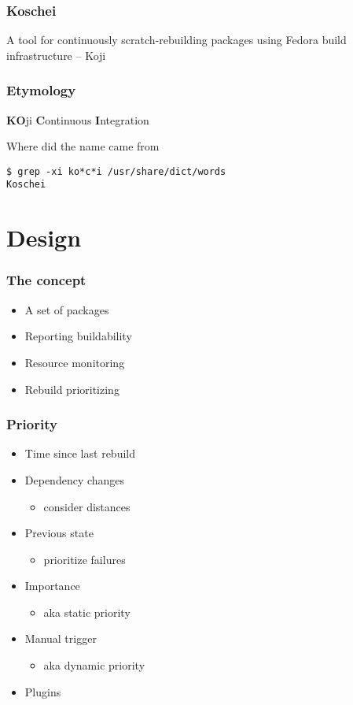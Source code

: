\documentclass[pdftex,unicode,xcolor=table]{beamer}
\begin{document}
\Large
\begin{frame}
  \frametitle{Koschei}
  A tool for continuously scratch-rebuilding
  packages using Fedora build infrastructure -- Koji
\end{frame}

\large
\begin{frame}[fragile]
  \frametitle{Etymology}
\textbf{KO}ji \textbf{C}ontinuous \textbf{I}ntegration
\vspace{30 pt}
\begin{block}{Where did the name came from}
\begin{verbatim}
$ grep -xi ko*c*i /usr/share/dict/words
Koschei
\end{verbatim}
\end{block}
\end{frame}

\section{Design}
\begin{frame}
  \frametitle{The concept}
  \begin{itemize}
  \item A set of packages
  \item Reporting buildability
  \item Resource monitoring
  \item Rebuild prioritizing
  \end{itemize}
\end{frame}

\begin{frame}
  \frametitle{Priority}
  \begin{itemize}
    \item Time since last rebuild
    \item Dependency changes
    \begin{itemize}
      \item consider distances
    \end{itemize}
    \item Previous state
    \begin{itemize}
      \item prioritize failures
    \end{itemize}
    \item Importance
    \begin{itemize}
      \item aka static priority
    \end{itemize}
    \item Manual trigger
    \begin{itemize}
      \item aka dynamic priority
    \end{itemize}
    \item Plugins
  \end{itemize}
\end{frame}
\end{document}
